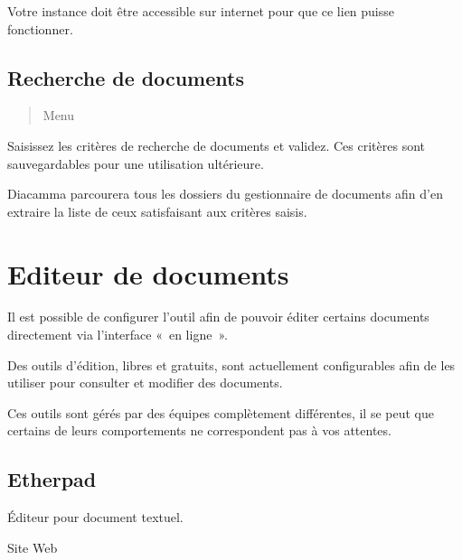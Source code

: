 \documentclass[a4paper,10pt,oneside,french]{sphinxmanual}
\begin{document}
\sphinxAtStartPar
{} Votre instance doit être accessible sur internet pour que ce lien puisse fonctionner.


\subsection{Recherche de documents}
\label{\detokenize{documents/shared_document:recherche-de-documents}}\begin{quote}

\sphinxAtStartPar
Menu 
\end{quote}

\sphinxAtStartPar
Saisissez les critères de recherche de documents et validez. Ces critères sont sauvegardables pour une utilisation ultérieure.

\sphinxAtStartPar
Diacamma parcourera tous les dossiers du gestionnaire de documents afin d’en extraire la liste de ceux satisfaisant aux critères saisis.


\section{Editeur de documents}
\label{\detokenize{documents/editor:editeur-de-documents}}\label{\detokenize{documents/editor::doc}}
\sphinxAtStartPar
Il est possible de configurer l’outil afin de pouvoir éditer certains documents directement via l’interface « en ligne ».

\sphinxAtStartPar
Des outils d’édition, libres et gratuits, sont actuellement configurables afin de les utiliser pour consulter et modifier des documents.

\sphinxAtStartPar
{} Ces outils sont gérés par des équipes complètement différentes, il se peut que certains de leurs comportements ne correspondent pas à vos attentes.


\subsection{Etherpad}
\label{\detokenize{documents/editor:etherpad}}
\sphinxAtStartPar
Éditeur pour document textuel.

\sphinxAtStartPar
Site Web
\begin{quote}

\sphinxAtStartPar
{}
\end{quote}
\end{document}
